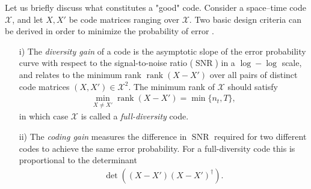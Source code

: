\documentclass[smallextended]{svjour3}
\DeclareMathOperator{\rk}{rank}
\DeclareMathOperator{\SNR}{SNR}
\begin{document}

Let us briefly discuss what constitutes a "good" code. Consider a space--time code $\mathcal{X}$, and let $X, X'$ be code matrices ranging over $\mathcal{X}$.
Two basic design criteria can be derived in order to minimize the probability of error \cite{TSC}. 
\begin{itemize}
	\item[i)] The \emph{diversity gain} of a code is the asymptotic slope of the error probability curve with respect to the signal-to-noise ratio ($\SNR$) in a $\log-\log$ scale, and relates to the minimum rank $\rk(X-X')$ over all pairs of distinct code matrices $(X,X') \in \mathcal{X}^2$. The minimum rank of $\mathcal{X}$ should satisfy 
	\begin{align*}
		\min_{X \neq X'} \rk(X-X') = \min\{n_t,T\},
	\end{align*} 
	in which case $\mathcal{X}$ is called a \emph{full-diversity} code.

	\item[ii)] 
	The \emph{coding gain} measures the difference in $\SNR$ required for two different codes to achieve the same error probability. For a full-diversity code this is proportional to the determinant
\begin{align*}
	\det \left( (X-X')(X-X')^{\dagger}\right).
\end{align*}
\end{itemize}
\end{document}
